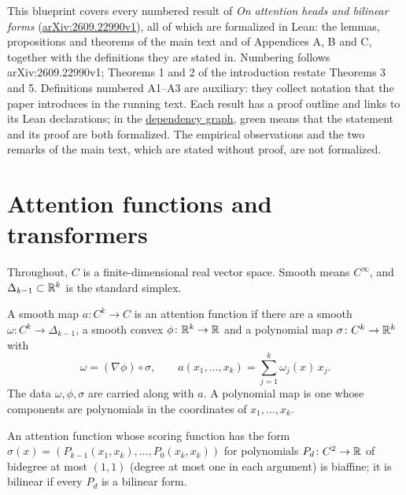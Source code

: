 This blueprint covers every numbered result of \emph{On attention heads and
bilinear forms}
(\href{https://arxiv.org/abs/2609.22990v1}{arXiv:2609.22990v1}), all of which
are formalized in Lean: the lemmas,
propositions and theorems of the main text and of Appendices A, B and C,
together with the definitions they are stated in. Numbering follows arXiv:2609.22990v1;
Theorems 1 and 2 of the introduction restate Theorems 3 and 5. Definitions
numbered A1--A3 are auxiliary: they collect notation that the paper introduces
in the running text. Each result has a proof outline and links to its Lean
declarations; in the \href{dep_graph_document.html}{dependency graph}, green
means that the statement and its proof are both formalized. The empirical
observations and the two remarks of the main text, which are stated without
proof, are not formalized.

\chapter{Attention functions and transformers}

Throughout, $C$ is a finite-dimensional real vector space. Smooth means
$C^\infty$, and $\Delta_{k-1}\subset\mathbb{R}^k$ is the standard simplex.

\begin{definition}
\label{def:attention-function}
\leanok
A smooth map $a\colon C^k\to C$ is an attention function if there are a
smooth $\omega\colon C^k\to\Delta_{k-1}$, a smooth convex
$\phi\colon\mathbb{R}^k\to\mathbb{R}$ and a polynomial map $\sigma\colon C^k\to\mathbb{R}^k$ with
\[
 \omega=(\nabla\phi)\circ\sigma,\qquad a(x_1,\ldots,x_k)=\sum_{j=1}^k\omega_j(x)\,x_j.
\]
The data $\omega,\phi,\sigma$ are carried along with $a$. A polynomial map is
one whose components are polynomials in the coordinates of $x_1,\ldots,x_k$.
\end{definition}

\begin{definition}
\label{def:bilinear}
\leanok
{}
An attention function whose scoring function has the form
$\sigma(x)=(P_{k-1}(x_1,x_k),\ldots,P_0(x_k,x_k))$ for polynomials
$P_d\colon C^2\to\mathbb{R}$ of bidegree at most $(1,1)$ (degree at most one in
each argument) is biaffine; it is bilinear if every $P_d$ is a bilinear
form.
\end{definition}


